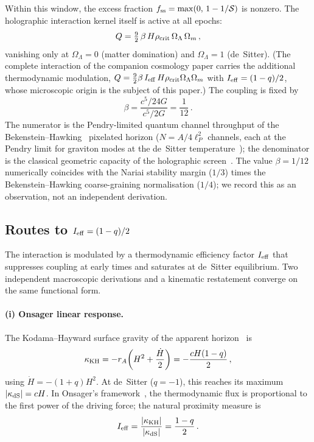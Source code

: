 \documentclass[aps,prd,twocolumn,10pt,superscriptaddress,nofootinbib]{revtex4-2}
\begin{document}
Within this window, the excess fraction
$f_{\rm ss} = \max(0,\,1 - 1/\mathcal{S})$ is nonzero.  The holographic
interaction kernel itself is active at all epochs:
\begin{equation}
Q = \tfrac{9}{2}\,\beta\,H\rho_{\rm crit}\,\Omega_\Lambda\,\Omega_m\,,
\label{eq:Q}
\end{equation}
vanishing only at $\Omega_\Lambda = 0$ (matter domination)
and $\Omega_\Lambda = 1$ (de~Sitter).  (The complete interaction
of the companion cosmology paper carries the additional thermodynamic modulation,
$Q = \tfrac{9}{2}\beta\,I_{\rm eff}\,H\rho_{\rm crit}\Omega_\Lambda\Omega_m$
with $I_{\rm eff} = (1-q)/2$, whose microscopic origin is the
subject of this paper.)  The coupling is fixed by
\begin{equation}
\beta = \frac{c^5/24G}{c^5/2G} = \frac{1}{12}\,.
\label{eq:beta}
\end{equation}
The numerator is the Pendry-limited quantum channel throughput of
the Bekenstein--Hawking~\cite{Bekenstein1973,Hawking1975} pixelated horizon
($N = A/4\ell_P^2$ channels, each at the Pendry limit for graviton
modes at the de~Sitter temperature~\cite{GibbonsHawking1977}); the denominator is the
classical geometric capacity of the holographic
screen~\cite{Pendry1983}.  The value $\beta = 1/12$ numerically coincides with the Nariai
stability margin ($1/3$) times the Bekenstein--Hawking
coarse-graining normalisation ($1/4$); we record this as an
observation, not an independent derivation.

\subsection{Routes to \texorpdfstring{$I_{\rm eff} = (1-q)/2$}{I\_eff = (1-q)/2}}
\label{sec:three_routes}

The interaction is modulated by a thermodynamic efficiency factor
$I_{\rm eff}$ that suppresses coupling at early times and saturates
at de~Sitter equilibrium.  Two independent macroscopic derivations
and a kinematic restatement converge on the same functional form.

\paragraph{(i) Onsager linear response.}
The Kodama--Hayward surface gravity of the apparent
horizon~\cite{Hayward1998} is
\begin{equation}
\kappa_{\rm KH} = -r_A\!\left(H^2 + \frac{\dot{H}}{2}\right)
  = -\frac{cH(1-q)}{2}\,,
\label{eq:kappa_KH}
\end{equation}
using $\dot{H} = -(1+q)H^2$.  At de~Sitter ($q = -1$), this
reaches its maximum $|\kappa_{\rm dS}| = cH$.  In Onsager's
framework~\cite{Onsager1931}, the thermodynamic flux is proportional to the first
power of the driving force; the natural proximity measure is
\begin{equation}
I_{\rm eff} = \frac{|\kappa_{\rm KH}|}{|\kappa_{\rm dS}|} = \frac{1-q}{2}\,.
\label{eq:Ieff_onsager}
\end{equation}
\end{document}
